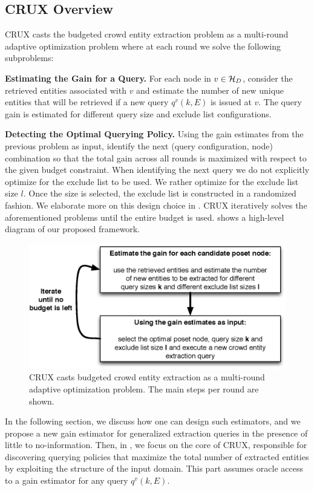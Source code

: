 \subsection{CRUX Overview}
\label{sec:framework}
CRUX casts the budgeted crowd entity extraction problem as a multi-round adaptive optimization problem where at each round we solve the following subproblems: 
\squishlist 
\item \textbf{Estimating the Gain for a Query.} For each node in $v \in \mathcal{H}_D$, consider the retrieved entities associated with $v$ and estimate the number of new unique entities that will be retrieved if a new query $q^v(k,E)$ is issued at $v$. The query gain is estimated for different query size and exclude list configurations.
\item \textbf{Detecting the Optimal Querying Policy.} Using the gain estimates from the previous problem as input, identify the next (query configuration, node) combination so that the total gain across all rounds is maximized with respect to the given budget constraint. When identifying the next query we do not explicitly optimize for the exclude list to be used. We rather optimize for the exclude list size $l$. Once the size is selected, the exclude list is constructed in a randomized fashion. We elaborate more on this design choice in .
\squishend
CRUX iteratively solves the aforementioned problems until the entire budget is used.  shows a high-level diagram of our proposed framework.

\begin{figure}
	\begin{center}
	\includegraphics[clip,scale=0.43]{figs/framework.eps}
	\caption{CRUX casts budgeted crowd entity extraction as a multi-round adaptive optimization problem. The main steps per round are shown.}
	\label{fig:framework}
	\vspace{-20pt}
	\end{center}
\end{figure}

In the following section, we discuss how one can design such estimators, and we propose a new gain estimator for generalized extraction queries in the presence of little to no-information. Then, in , we focus on the core of CRUX, responsible for discovering querying policies that maximize the total number of extracted entities by exploiting the structure of the input domain. This part assumes oracle access to a gain estimator for any query $q^v(k,E)$. 